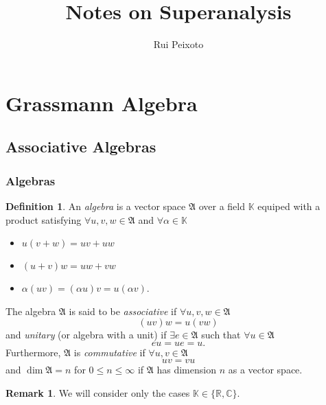 \documentclass{article}
\title{Notes on Superanalysis}
\author{Rui Peixoto}
\date{}
\theoremstyle{definition}
\newtheorem{definition}{Definition}
\newtheorem*{remark}{Remark}
\begin{document}
\maketitle

\section{Grassmann Algebra}

\subsection{Associative Algebras}

\subsubsection{Algebras}

\begin{definition}
    An \emph{algebra} is a vector space $\mathfrak{A}$ over a field $\mathbb{K}$ equiped with a product satisfying $\forall u, v, w \in \mathfrak{A}$ and $\forall \alpha \in \mathbb{K}$
    \begin{itemize}
        \item $u(v + w) = uv + uw$
        \item $(u + v)w = uw + vw$
        \item $\alpha (u v) = (\alpha u) v = u (\alpha v)$.
    \end{itemize}

    The algebra $\mathfrak{A}$ is said to be \emph{associative} if $\forall u, v, w \in \mathfrak{A}$
    \begin{equation*}
        (uv)w = u(vw)
    \end{equation*}
    and \emph{unitary} (or algebra with a unit) if $\exists e \in \mathfrak{A}$ such that $\forall u \in \mathfrak{A}$
    \begin{equation*}
        eu = ue = u.
    \end{equation*}
    Furthermore, $\mathfrak{A}$ is \emph{commutative} if $\forall u, v \in \mathfrak{A}$
    \begin{equation*}
        uv = vu
    \end{equation*}
    and $\dim \mathfrak{A} = n$ for $0 \leq n \leq \infty$ if $\mathfrak{A}$ has dimension $n$ as a vector space.
\end{definition}

\begin{remark}
    We will consider only the cases $\mathbb{K} \in \{\mathbb{R}, \mathbb{C}\}$.
\end{remark}
\end{document}
